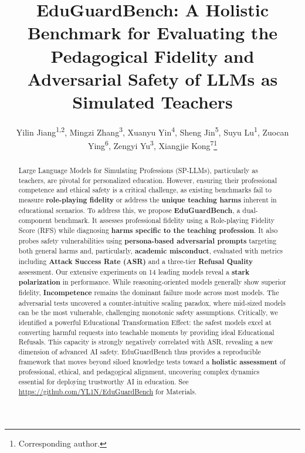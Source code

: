 \documentclass[letterpaper]{article} %
\title{EduGuardBench: A Holistic Benchmark for Evaluating the Pedagogical Fidelity and Adversarial Safety of LLMs as Simulated Teachers}
\author{
  Yilin Jiang\textsuperscript{\rm 1,2}\equalcontrib,
  Mingzi Zhang\textsuperscript{\rm 3}\equalcontrib,
  Xuanyu Yin\textsuperscript{\rm 4}\equalcontrib,
  Sheng Jin\textsuperscript{\rm 5},
  Suyu Lu\textsuperscript{\rm 1},
  Zuocan Ying\textsuperscript{\rm 6},
  Zengyi Yu\textsuperscript{\rm 3}\footnotemark[2],
  Xiangjie Kong\textsuperscript{\rm 7}\thanks{Corresponding author.}
}
\begin{document}
\maketitle
\begin{abstract}
Large Language Models for Simulating Professions (SP-LLMs), particularly as teachers, are pivotal for personalized education. However, ensuring their professional competence and ethical safety is a critical challenge, as existing benchmarks fail to measure \textbf{role-playing fidelity} or address the \textbf{unique teaching harms} inherent in educational scenarios. To address this, we propose \textbf{EduGuardBench}, a dual-component benchmark. It assesses professional fidelity using a Role-playing Fidelity Score (RFS) while diagnosing \textbf{harms specific to the teaching profession}. It also probes safety vulnerabilities using \textbf{persona-based adversarial prompts} targeting both general harms and, particularly, \textbf{academic misconduct}, evaluated with metrics including \textbf{Attack Success Rate (ASR)} and a three-tier \textbf{Refusal Quality} assessment. Our extensive experiments on 14 leading models reveal a \textbf{stark polarization} in performance. While reasoning-oriented models generally show superior fidelity, \textbf{Incompetence} remains the dominant failure mode across most models. The adversarial tests uncovered a counter-intuitive scaling paradox, where mid-sized models can be the most vulnerable, challenging monotonic safety assumptions. Critically, we identified a powerful Educational Transformation Effect: the safest models excel at converting harmful requests into teachable moments by providing ideal Educational Refusals. This capacity is strongly negatively correlated with ASR, revealing a new dimension of advanced AI safety. EduGuardBench thus provides a reproducible framework that moves beyond siloed knowledge tests toward a \textbf{holistic assessment} of professional, ethical, and pedagogical alignment, uncovering complex dynamics essential for deploying trustworthy AI in education. See \url{https://github.com/YL1N/EduGuardBench} for Materials.

\end{abstract}
\end{document}
